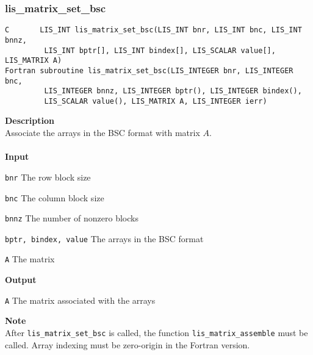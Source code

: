 \documentclass[a4paper]{article}
\newcommand{\namelistlabel}[1]{\mbox{#1}\hfill}
\newenvironment{namelist}[1]{%
\begin{list}{}
  {\let\makelabel\namelistlabel
  \settowidth{\labelwidth}{#1}
  \setlength{\leftmargin}{1.1\labelwidth}}
  }{%
\end{list}}
\begin{document}
\subsubsection{lis\_matrix\_set\_bsc}
\begin{screen}
\verb|C       LIS_INT lis_matrix_set_bsc(LIS_INT bnr, LIS_INT bnc, LIS_INT bnnz,|\\
\verb|         LIS_INT bptr[], LIS_INT bindex[], LIS_SCALAR value[], LIS_MATRIX A)|\\
\verb|Fortran subroutine lis_matrix_set_bsc(LIS_INTEGER bnr, LIS_INTEGER bnc,|\\
\verb|         LIS_INTEGER bnnz, LIS_INTEGER bptr(), LIS_INTEGER bindex(),|\\
\verb|         LIS_SCALAR value(), LIS_MATRIX A, LIS_INTEGER ierr)|
\end{screen}
{\bf Description}\\
\indent
Associate the arrays in the BSC format with matrix $A$.
\\ \\
\noindent
{\bf Input}
\begin{namelist}{XXXXXXXXXXXXXXXXXXXX}
\item[\tt bnr] The row block size
\item[\tt bnc] The column block size
\item[\tt bnnz] The number of nonzero blocks
\item[\tt bptr, bindex, value] The arrays in the BSC format
\item[\tt A] The matrix
\end{namelist}
{\bf Output}
\begin{namelist}{XXXXXXXXXXXXXXXXXXXX}
\item[\tt A] The matrix associated with the arrays
\end{namelist}
\noindent
{\bf Note}\\
\indent
After \verb|lis_matrix_set_bsc| is called, 
the function \verb|lis_matrix_assemble| must be called. 
Array indexing must be zero-origin in the Fortran version.

\newpage
\end{document}
